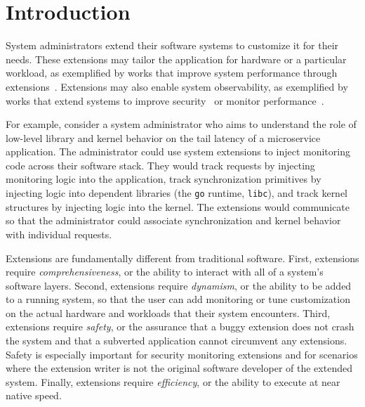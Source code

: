 \section{Introduction}

System administrators extend their software systems to customize it for their needs.  These extensions may tailor the application for hardware or a particular workload, as exemplified by works that improve system performance through extensions~\cite{Ghigoff21, Zhong22}.  Extensions may also enable system observability, as exemplified by works that extend systems to improve security~\cite{Jia23} or monitor performance~\cite{Gregg19, shen2023network,Zhu23}.  

For example, consider a system administrator who aims to understand the role of low-level library and kernel behavior on the tail latency of a microservice application.  The administrator could use system extensions to inject monitoring code across their software stack.  They would track requests by injecting monitoring logic into the application, track synchronization primitives by injecting logic into dependent libraries (\eg the \texttt{go} runtime, \texttt{libc}), and track kernel structures by injecting logic into the kernel.  The extensions would communicate so that the administrator could associate synchronization and kernel behavior with individual requests.

Extensions are fundamentally different from traditional software.  First, extensions require \emph{comprehensiveness}, or the ability to  interact with all of a system's software layers.  Second, extensions require \emph{dynamism}, or the ability to be added to a running system, so that the user can add monitoring or tune customization on the actual hardware and workloads that their system encounters.  Third, extensions require \emph{safety}, or the assurance that a buggy extension does not crash the system and that a subverted application cannot circumvent any extensions.  Safety is especially important for security monitoring extensions and for scenarios where the extension writer is not the original software developer of the extended system.  Finally, extensions require \emph{efficiency}, or the ability to execute at near native speed. 

